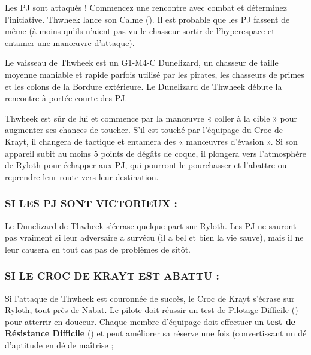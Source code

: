 \documentclass[a4paper,10pt,twoside,twocolumn,openany]{book}
\begin{document}
Les PJ sont attaqués ! Commencez une rencontre
avec combat et déterminez l’initiative. Thwheek lance
son Calme (\difficulty \difficulty). Il est probable que les PJ fassent
de même (à moins qu’ils n’aient pas vu le chasseur
sortir de l’hyperespace et entamer une manœuvre
d’attaque).

Le vaisseau de Thwheek est un G1-M4-C Dunelizard,
un chasseur de taille moyenne maniable et rapide parfois
utilisé par les pirates, les chasseurs de primes et les colons de la Bordure extérieure. Le Dunelizard de Thwheek
débute la rencontre à portée courte des PJ.

Thwheek est sûr de lui et commence par la manœuvre
« coller à la cible » pour augmenter ses chances de toucher. S’il est touché par l’équipage du Croc de Krayt,
il changera de tactique et entamera des « manœuvres
d’évasion ». Si son appareil subit au moins 5 points
de dégâts de coque, il plongera vers l’atmosphère de
Ryloth pour échapper aux PJ, qui pourront le pourchasser et l’abattre ou reprendre leur route vers leur
destination.

\subsubsection{SI LES PJ SONT VICTORIEUX :}
Le Dunelizard de Thwheek s’écrase quelque part sur Ryloth. Les PJ ne sauront pas vraiment si leur adversaire
a survécu (il a bel et bien la vie sauve), mais il ne leur
causera en tout cas pas de problèmes de sitôt.

\subsubsection{SI LE CROC DE KRAYT EST ABATTU :}
Si l’attaque de Thwheek est couronnée de succès, le
Croc de Krayt s’écrase sur Ryloth, tout près de Nabat.
Le pilote doit réussir un test de Pilotage Difficile
(\difficulty \difficulty \difficulty) pour atterrir en douceur. Chaque membre
d’équipage doit effectuer un \textbf{test de Résistance Difficile} (\difficulty \difficulty \difficulty) et peut améliorer sa réserve une fois
(convertissant un dé d’aptitude \ability en dé de maîtrise \proficiency ;
\end{document}
